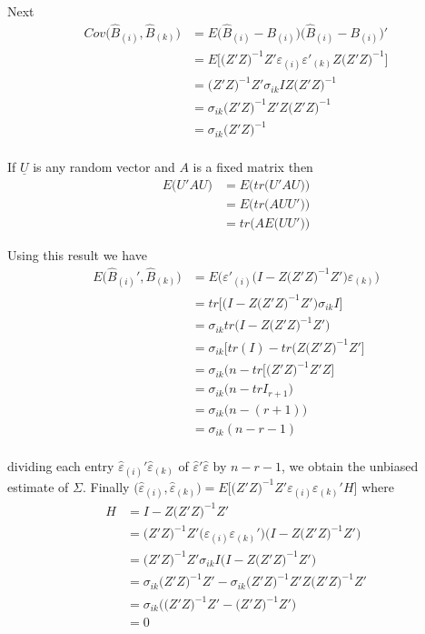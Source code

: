 \documentclass[11pt,a4paper]{article}
\theoremstyle{definition}
\begin{document}
Next
\begin{align*}
Cov\big(\widehat{B}_{(i)},\widehat{B}_{(k)}\big) & = E\big(\widehat{B}_{(i)}-B_{(i)}\big)\big(\widehat{B}_{(i)}-B_{(i)}\big)'\\
& = E\big[\big(Z'Z\big)^{-1}Z'\varepsilon_{(i)}\varepsilon'_{(k)}Z\big(Z'Z\big)^{-1}\big]\\
& = \big(Z'Z\big)^{-1}Z'\sigma_{ik}IZ\big(Z'Z\big)^{-1}\\
& = \sigma_{ik}\big(Z'Z\big)^{-1}Z'Z\big(Z'Z\big)^{-1}\\
& = \sigma_{ik}\big(Z'Z\big)^{-1}\\
\end{align*}



If $\underline{U}$ is any random vector and $A$ is a fixed matrix then
\begin{align*}
E\big(U'AU\big) & = E\big(tr\big(U'AU\big)\big)\\
                & = E\big(tr(AUU'\big)\big)\\
                & = tr\big(AE\big(UU'\big)\big)
\end{align*}

Using this result we have
\begin{align*}
E\big(\widehat{B}_{(i)}',\widehat{B}_{(k)}\big) & = E\big(\varepsilon'_{(i)}\big(I-Z\big(Z'Z\big)^{-1}Z'\big)\varepsilon_{(k)}\big)\\
& = tr\big[\big(I-Z\big(Z'Z\big)^{-1}Z'\big)\sigma_{ik}I\big]\\
& = \sigma_{ik}tr\big(I-Z\big(Z'Z\big)^{-1}Z'\big)\\
& = \sigma_{ik}\big[tr(I)-tr\big(Z\big(Z'Z\big)^{-1}Z'\big]\\
& = \sigma_{ik}\big(n-tr\big[\big(Z'Z\big)^{-1}Z'Z\big]\\
& = \sigma_{ik}\big(n-tr I_{r+1}\big)\\
& = \sigma_{ik}\big(n-(r+1)\big)\\
& = \sigma_{ik}(n-r-1)\\
\end{align*}

dividing each entry  $\widehat{\varepsilon}_{(i)}'\widehat{\varepsilon}_{(k)}$ of $\widehat{\varepsilon}'\widehat{\varepsilon}$ by $n-r-1$, we obtain the unbiased estimate of $\Sigma$. Finally $\big(\widehat{\varepsilon}_{(i)},\widehat{\varepsilon}_{(k)}\big) = E\big[\big(Z'Z\big)^{-1}Z'\varepsilon_{(i)}\varepsilon_{(k)}'H\big]$ where 
\begin{align*}
H &  = I- Z\big(Z'Z\big)^{-1}Z'\\
  & = \big(Z'Z\big)^{-1}Z'\big(\varepsilon_{(i)}\varepsilon_{(k)}'\big)\big(I-Z\big(Z'Z\big)^{-1}Z'\big)\\
  & = \big(Z'Z\big)^{-1}Z'\sigma_{ik}I\big(I-Z\big(Z'Z\big)^{-1}Z'\big)\\
  & = \sigma_{ik}\big(Z'Z\big)^{-1}Z'-\sigma_{ik}\big(Z'Z\big)^{-1}Z'Z\big(Z'Z\big)^{-1}Z'\\
  & = \sigma_{ik}\big(\big(Z'Z\big)^{-1}Z'-\big(Z'Z\big)^{-1}Z'\big)\\
  & = 0
\end{align*}
\end{document}
